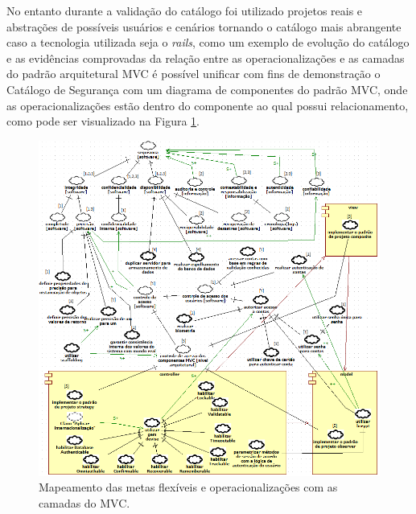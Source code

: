 \pagebreak

No entanto durante a validação do catálogo foi utilizado projetos reais e abstrações de possíveis usuários e cenários tornando o catálogo mais abrangente caso a tecnologia utilizada seja o \textit{rails}, como um exemplo de evolução do catálogo e as evidências comprovadas da relação entre as operacionalizações e as camadas do padrão arquitetural MVC é possível unificar com fins de demonstração o Catálogo de Segurança com um diagrama de componentes do padrão MVC, onde as operacionalizações estão dentro do componente ao qual possui relacionamento, como pode ser visualizado na Figura \ref{catalogoMapeado}. 

\begin{figure}[h!]
	\centering
	\includegraphics[keepaspectratio=true,scale=0.7]{figuras/catalogoMapeado.PNG}
	\caption{Mapeamento das metas flexíveis e operacionalizações com as camadas do MVC.}
	\label{catalogoMapeado}
\end{figure}


